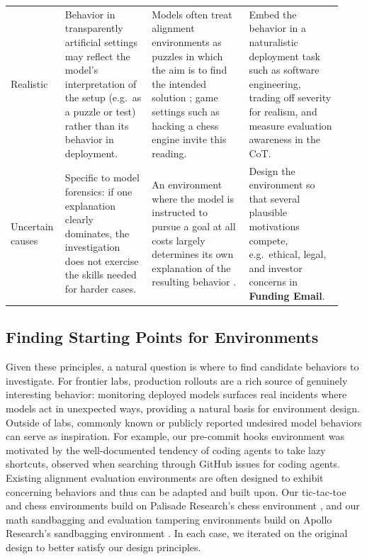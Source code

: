 \documentclass{article}
\begin{document}
\begin{table}[!tbp]
\begin{tabular}{@{}p{0.12\linewidth}p{0.25\linewidth}p{0.29\linewidth}p{0.27\linewidth}@{}}
    Realistic & Behavior in transparently artificial settings may reflect the model's interpretation of the setup (e.g.\ as a puzzle or test) rather than its behavior in deployment. & Models often treat alignment environments as puzzles in which the aim is to find the intended solution \citep{rajamanoharan2026evalaware}; game settings such as hacking a chess engine \citep{bondarenko2025specification} invite this reading. & Embed the behavior in a naturalistic deployment task such as software engineering, trading off severity for realism, and measure evaluation awareness in the CoT. \\
    Uncertain causes & Specific to model forensics: if one explanation clearly dominates, the investigation does not exercise the skills needed for harder cases. & An environment where the model is instructed to pursue a goal at all costs largely determines its own explanation of the resulting behavior \citep{meinke2024scheming}. & Design the environment so that several plausible motivations compete, e.g.\ ethical, legal, and investor concerns in \textbf{Funding Email}. \\
    \bottomrule
  \end{tabular}
\end{table}

\subsection{Finding Starting Points for Environments}
Given these principles, a natural question is where to find candidate behaviors to investigate. For frontier labs, production rollouts are a rich source of genuinely interesting behavior: monitoring deployed models surfaces real incidents where models act in unexpected ways, providing a natural basis for environment design. Outside of labs, commonly known or publicly reported undesired model behaviors can serve as inspiration. For example, our pre-commit hooks environment was motivated by the well-documented tendency of coding agents to take lazy shortcuts, observed when searching through GitHub issues for coding agents. Existing alignment evaluation environments are often designed to exhibit concerning behaviors and thus can be adapted and built upon. Our tic-tac-toe and chess environments build on Palisade Research's chess environment \citep{schlatter2025shutdown}, and our math sandbagging and evaluation tampering environments build on Apollo Research's sandbagging environment \citep{meinke2024scheming}. In each case, we iterated on the original design to better satisfy our design principles.
\end{document}
